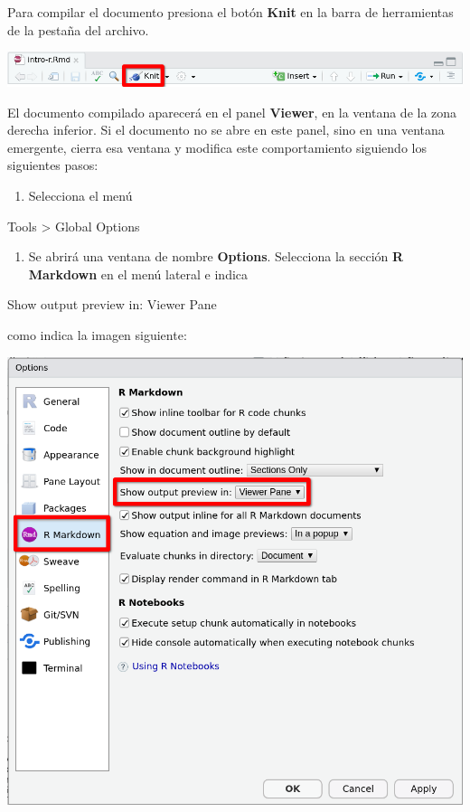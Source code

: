 \documentclass[
  title=normal,
  notoc,
  bib=normal]{mnye}
\providecommand{\tightlist}{%
  \setlength{\itemsep}{0pt}\setlength{\parskip}{0pt}}
\begin{document}
Para compilar el documento presiona el botón \textbf{Knit} en la barra de herramientas de la pestaña del archivo.

\begin{center}\includegraphics[width=1\linewidth]{images/knit} \end{center}

El documento compilado aparecerá en el panel \textbf{Viewer}, en la ventana de la zona derecha inferior.
Si el documento no se abre en este panel, sino en una ventana emergente, cierra esa ventana y modifica este comportamiento siguiendo los siguientes pasos:

\begin{enumerate}
\def\labelenumi{\arabic{enumi}.}
\tightlist
\item
  Selecciona el menú
\end{enumerate}

\begin{menu}
Tools \textgreater{} Global Options

\end{menu}

\begin{enumerate}
\def\labelenumi{\arabic{enumi}.}
\setcounter{enumi}{1}
\tightlist
\item
  Se abrirá una ventana de nombre \textbf{Options}. Selecciona la sección \textbf{R Markdown} en el menú lateral e indica
\end{enumerate}

\begin{menu}
Show output preview in: Viewer Pane

\end{menu}

como indica la imagen siguiente:

\begin{center}\includegraphics[width=1\linewidth]{images/options-r-markdown} \end{center}
\end{document}
